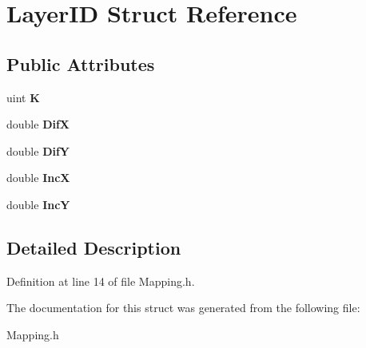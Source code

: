 \section{Layer\-I\-D Struct Reference}
\label{structLayerID}
\subsection*{Public Attributes}
\begin{DoxyCompactItemize}
\item 
uint {\bfseries K}\label{structLayerID_aaae69b2b507a06e92ec5056df97d1aef}

\item 
double {\bfseries Dif\-X}\label{structLayerID_ad5e1a845f146c491315bb6a02ba10fe5}

\item 
double {\bfseries Dif\-Y}\label{structLayerID_a6a857d5bf9e3253818972e2945d4dbf3}

\item 
double {\bfseries Inc\-X}\label{structLayerID_a60b87feb96a8881d789b5fd4ccc48db4}

\item 
double {\bfseries Inc\-Y}\label{structLayerID_aea0866309504ac61d29021d6abfe5c78}

\end{DoxyCompactItemize}


\subsection{Detailed Description}


Definition at line 14 of file Mapping.\-h.



The documentation for this struct was generated from the following file\-:\begin{DoxyCompactItemize}
\item 
Mapping.\-h\end{DoxyCompactItemize}
